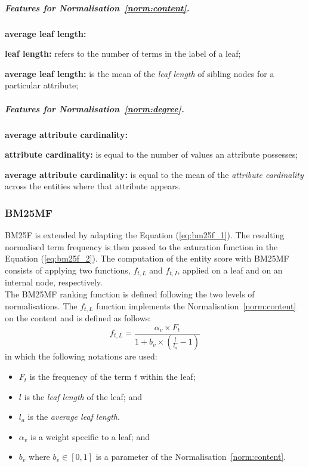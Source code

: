 \subparagraph{Features for Normalisation~\ref{norm:content}.}

\begin{labeling}{\textbf{average leaf length:}}
  \item[\textbf{leaf length:}] refers to the number of terms in the label of a leaf;
  \item[\textbf{average leaf length:}] is the mean of the \emph{leaf length} of sibling nodes for a particular attribute;
\end{labeling}

\subparagraph{Features for Normalisation~\ref{norm:degree}.}

\begin{labeling}{\textbf{average attribute cardinality:}}
  \item[\textbf{attribute cardinality:}] is equal to the number of values an attribute possesses;
  \item[\textbf{average attribute cardinality:}] is equal to the mean of the \emph{attribute cardinality} across the entities where that attribute appears.
\end{labeling}

\subsubsection{BM25MF}
\label{sec:bm25mf-function}

BM25F is extended by adapting the Equation (\ref{eq:bm25f_1}). The resulting normalised term frequency is then passed to the saturation function in the Equation (\ref{eq:bm25f_2}).
The computation of the entity score with BM25MF consists of applying two functions, $f_{t,L}$ and $f_{t,I}$, applied on a leaf and on an internal node, respectively.\\

The BM25MF ranking function is defined following the two levels of normalisations.
The $f_{t,L}$ function implements the Normalisation~\ref{norm:content} on the content and is defined as follows:
\begin{equation}
\label{bm25mf_v}
f_{t,L} = \frac{\alpha_v\times F_t}{1+b_v\times\left(\frac{l}{l_a}-1\right)}
\end{equation}
in which the following notations are used:
\begin{itemize}
	\item $F_t$ is the frequency of the term $t$ within the leaf;
	\item $l$ is the \emph{leaf length} of the leaf; and
	\item $l_a$ is the \emph{average leaf length}.
	\item $\alpha_v$ is a weight specific to a leaf; and
	\item $b_v$ where $b_v \in \left[0,1\right]$ is a parameter of the Normalisation~\ref{norm:content}.
\end{itemize}

